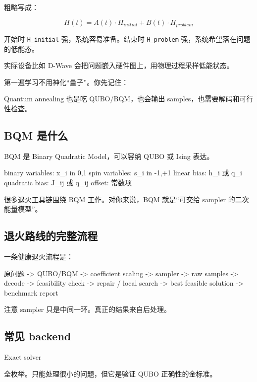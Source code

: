 \documentclass[UTF8,12pt,a4paper]{ctexart}
\begin{document}
粗略写成：

\[
H(t) = A(t) \cdot  H_{initial} + B(t) \cdot  H_{problem}
\]

开始时 \texttt{H\_initial} 强，系统容易准备。结束时 \texttt{H\_problem} 强，系统希望落在问题的低能态。

实际设备比如 D-Wave 会把问题嵌入硬件图上，用物理过程采样低能状态。

第一遍学习不用神化“量子”。你先记住：

\begin{GuideVerbatim}
Quantum annealing 也是吃 QUBO/BQM，也会输出 samples，也需要解码和可行性检查。
\end{GuideVerbatim}

\subsection*{BQM 是什么}

BQM 是 Binary Quadratic Model，可以容纳 QUBO 或 Ising 表达。

\begin{GuideVerbatim}
binary variables: x_i in {0,1}
spin variables:   s_i in {-1,+1}
linear bias:      h_i 或 q_i
quadratic bias:   J_ij 或 q_ij
offset:           常数项
\end{GuideVerbatim}

很多退火工具链围绕 BQM 工作。对你来说，BQM 就是“可交给 sampler 的二次能量模型”。

\subsection*{退火路线的完整流程}

一条健康退火流程是：

\begin{GuideVerbatim}
原问题
  -> QUBO/BQM
  -> coefficient scaling
  -> sampler
  -> raw samples
  -> decode
  -> feasibility check
  -> repair / local search
  -> best feasible solution
  -> benchmark report
\end{GuideVerbatim}

注意 sampler 只是中间一环。真正的结果来自后处理。

\subsection*{常见 backend}

Exact solver

全枚举。只能处理很小的问题，但它是验证 QUBO 正确性的金标准。
\end{document}

